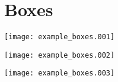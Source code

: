 \documentclass{article}
\newcommand{\figwidth}{0.95\linewidth}
\begin{document}
\newpage
\section{Boxes}
\begin{minipage}{\linewidth}
\centering
\begin{minipage}{0.8\linewidth}
\texttt{[image: example\_boxes.001]}
\end{minipage}
\end{minipage}
\bigskip

\begin{minipage}{\linewidth}
\centering
\begin{minipage}{0.2\linewidth}
\texttt{[image: example\_boxes.002]}
\end{minipage}
\end{minipage}
\bigskip

\begin{minipage}{\linewidth}
\centering
\begin{minipage}{\linewidth}
\texttt{[image: example\_boxes.003]}
\end{minipage}
\end{minipage}
\bigskip
\end{document}
